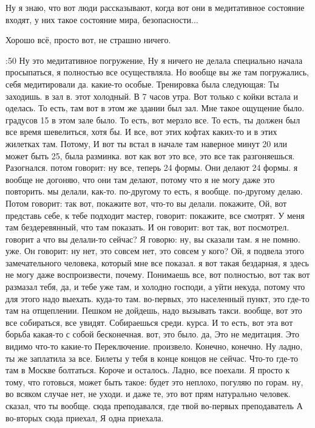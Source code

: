 \I
Ну я знаю, что вот люди рассказывают, когда вот они в
медитативное состояние входят,
у них такое состояние мира, безопасности...

\M
Хорошо всё, просто вот, не страшно ничего.

:50
Ну это медитативное погружение, Ну я ничего не делала специально начала просыпаться, я полностью все осуществляла. Но вообще вы же там погружались, себя медитировали да.
какие-то особые. Тренировка была следующая: Ты заходишь.
в зал в.
этот холодный.
В 7 часов утра.
Вот только с койки встала и оделась.
То есть, там вот в этом же здании был зал.
Мне такое ощущение было. градусов 15 в этом зале было.
То есть, вот мерзло все.
То есть, ты должен был все время шевелиться, хотя бы.
И все, вот этих кофтах каких-то и в этих жилетках там.
Потому, И вот ты встал в начале там наверное минут 20 или может быть 25, была разминка. вот как вот это все, это все так разгоняешься.
Разогнался. потом говорит: ну все, теперь 24 формы.
Они делают 24 формы. я вообще не догоняю, что они там делают, потому что я не могу даже это повторить. мы делали, как-то.
по-другому то есть, я вообще.
по-другому делаю.
Потом говорит: так вот, покажите вот, что-то вы делали. покажите, Ой, вот представь себе, к тебе подходит мастер, говорит: покажите, все смотрят.
У меня там бездеревянный, что там показать.
И он говорит: вот так, вот посмотрел. говорит а что вы делали-то сейчас?
Я говорю: ну, вы сказали там.
я не помню.
уже.
Он говорит: ну нет, это совсем нет, это совсем у кого? Ой, я подвела этого замечательного человека, который мне все показал. я вот такая бездарная, я здесь не могу даже воспроизвести, почему.
Понимаешь все, вот полностью, вот так вот размазал тебя, да, и тебе уже там, и холодно господи, а уйти некуда, потому что для этого надо выехать.
куда-то там. во-первых, это населенный пункт, это где-то там на отщеплении.
Пешком не дойдешь, надо вызывать такси. вообще, вот это все собираться, все увидят.
Собираешься среди.
курса. И то есть, вот эта вот борьба какая-то с собой бесконечная.
вот, это было. да, Это не медитация.
Это видимо что-то какие-то Переключение.
произвело.
Конечно, конечно.
Ну ладно, ты же заплатила за все.
Билеты у тебя в конце концов не сейчас.
Что-то где-то там в Москве болтаться.
Короче и осталось.
Ладно, все поехали.
Я просто к тому, что готовься, может быть такое:
будет это неплохо, погуляю по горам. ну, во всяком случае нет, не уходи. и даже те, это вот прям натурально человек.
сказал, что ты вообще.
сюда преподавался, где твой во-первых преподаватель А во-вторых
сюда приехал, Я одна приехала.
